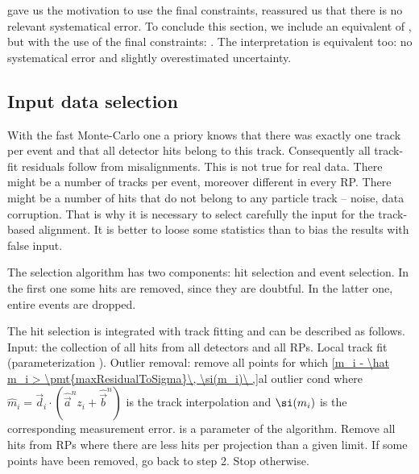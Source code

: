
 gave us the motivation to use the final constraints,  reassured us that there is no relevant systematical error. To conclude this section, we include an equivalent of , but with the use of the final constraints: . The interpretation is equivalent too: no systematical error and slightly overestimated uncertainty.



\subsection[al data sel]{Input data selection}

With the fast Monte-Carlo one a priory knows that there was exactly one track per event and that all detector hits belong to this track. Consequently all track-fit residuals follow from misalignments. This is not true for real data. There might be a number of tracks per event, moreover different in every RP. There might be a number of hits that do not belong to any particle track -- noise, data corruption. That is why it is necessary to select carefully the input for the track-based alignment. It is better to loose some statistics than to bias the results with false input.

The selection algorithm has two components: hit selection and event selection. In the first one some hits are removed, since they are doubtful. In the latter one, entire events are dropped.

The hit selection is integrated with track fitting and can be described as follows.
\bitm
\itm Input: the collection of all hits from all detectors and all RPs.
\itm Local track fit (parameterization ).
\itm Outlier removal: remove all points for which
\eqref{m_i - \hat m_i > \pmt{maxResidualToSigma}\, \si(m_i)\ ,}{al outlier cond}
where $\hat m_i = \vec d_i \cdot (\hat\vec a^n z_i + \hat\vec b^n)$ is the track interpolation and $\si(m_i)$ is the corresponding measurement error.  is a parameter of the algorithm.
\itm Remove all hits from RPs where there are less hits per projection than a given limit\break {}.
\itm If some points have been removed, go back to step 2. Stop otherwise.
\eitm

